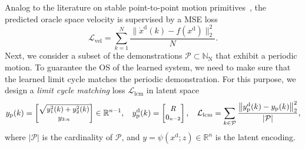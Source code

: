 Analog to the literature on stable point-to-point motion primitives~\citep{rana2020euclideanizing}, the predicted oracle space velocity is supervised by a \gls{MSE} loss
\begin{equation}
    \mathcal{L}_\mathrm{vel} = \sum_{k = 1}^{N} \frac{\lVert \dot{x}^\mathrm{d}(k) - f(x^\mathrm{d}) \rVert_2^2}{N}.
\end{equation}
Next, we consider a subset of the demonstrations $\mathcal{P} \subset \mathbb{N}_\mathrm{N}$ that exhibit a periodic motion. To guarantee the \gls{OS} of the learned system, we need to make sure that the learned limit cycle matches the periodic demonstration.
For this purpose, we design a \emph{limit cycle matching} loss $\mathcal{L}_\mathrm{lcm}$ in latent space
\begin{equation}\small
    y_\mathrm{p}(k) = \begin{bmatrix}
        \sqrt{y_1^2(k) + y_2^2(k)}\\ y_{3:n}
    \end{bmatrix} \in \mathbb{R}^{n-1},
    \quad
    y_\mathrm{p}^\mathrm{d}(k) = \begin{bmatrix}
        R\\ 0_{n-2}
    \end{bmatrix},
    \quad
    \mathcal{L}_\mathrm{lcm} = \sum_{k \in \mathcal{P}} \frac{\big \lVert y_\mathrm{p}^\mathrm{d}(k) - y_\mathrm{p}(k) \big \rVert_2^2}{|\mathcal{P}|},
\end{equation}
where $|\mathcal{P}|$ is the cardinality of $\mathcal{P}$, and $y=\psi(x^\mathrm{d}; z) \in \mathbb{R}^n$ is the latent encoding. %

